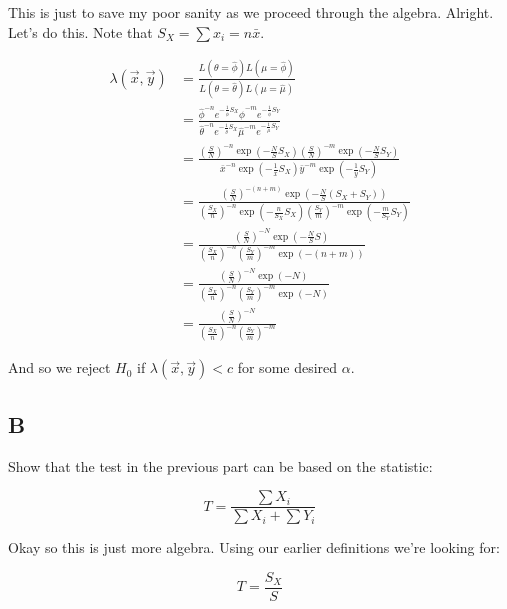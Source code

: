This is just to save my poor sanity as we proceed through the algebra. Alright. Let's do this. Note that $S_X = \sum x_i = n \bar{x}$.

\begin{align*}
	\lambda(\vec{x}, \vec{y}) &= \frac{L(\theta = \hat{\phi})L(\mu = \hat{\phi})}{L(\theta = \hat{\theta})L(\mu = \hat{\mu})} \\
	&= \frac
	{\hat{\phi}^{-n} e^{-\frac{1}{\hat{\phi}} S_X} \hat{\phi}^{-m} e^{-\frac{1}{\hat{\phi}} S_Y}}
	{\hat{\theta}^{-n} e^{-\frac{1}{\hat{\theta}} S_X} \hat{\mu}^{-m} e^{-\frac{1}{\hat{\mu}} S_Y}} \\
	&= \frac
	{\left( \frac{S}{N} \right)^{-n} \exp\left( -\frac{N}{S} S_X \right) \left( \frac{S}{N} \right)^{-m} \exp\left( -\frac{N}{S} S_Y \right)  }
	{\bar{x}^{-n} \exp\left(-\frac{1}{\bar{x}} S_X\right) \bar{y}^{-m} \exp\left(-\frac{1}{\bar{y}} S_Y\right)} \\
	&= \frac{\left( \frac{S}{N} \right)^{-(n+m)} \exp\left( -\frac{N}{S}\left( S_X + S_Y \right) \right) }
	{\left( \frac{S_X}{n} \right)^{-n} \exp\left(-\frac{n}{S_X} S_X\right) \left( \frac{S_Y}{m} \right)^{-m} \exp\left(-\frac{m}{S_Y} S_Y\right)} \\
	&= \frac{\left( \frac{S}{N} \right)^{-N} \exp\left( -\frac{N}{S} S \right)}{\left( \frac{S_X}{n} \right)^{-n} \left( \frac{S_Y}{m} \right)^{-m} \exp\left( -(n+m) \right) } \\ 
	&= \frac{\left( \frac{S}{N} \right)^{-N} \exp\left( -N \right)}{\left( \frac{S_X}{n} \right)^{-n} \left( \frac{S_Y}{m} \right)^{-m} \exp\left( -N \right) } \\ 
	&= \frac{\left( \frac{S}{N} \right)^{-N}}{\left( \frac{S_X}{n} \right)^{-n} \left( \frac{S_Y}{m} \right)^{-m}} 
\end{align*}

And so we reject $H_0$ if $\lambda(\vec{x}, \vec{y}) < c$ for some desired $\alpha$.

\pagebreak
\subsection*{B}

Show that the test in the previous part can be based on the statistic:

\[
	T = \frac{\sum X_i}{\sum X_i + \sum Y_i}
\]

Okay so this is just more algebra. Using our earlier definitions we're looking for:

\[
	T = \frac{S_X}{S}
\]

